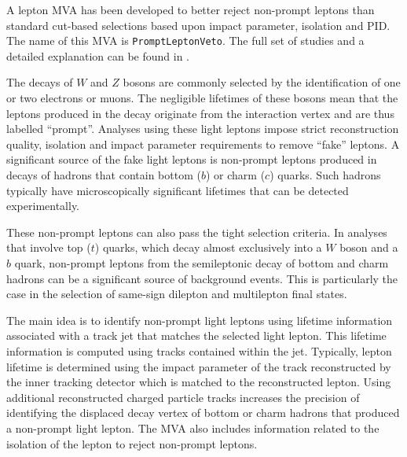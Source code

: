 
A lepton MVA has been developed to better reject non-prompt leptons than standard cut-based selections based upon impact parameter, isolation and PID. The name of this MVA is \texttt{PromptLeptonVeto}. The full set of studies and a detailed explanation can be found in \cite{ttW_140}.

The decays of $W$ and $Z$ bosons are commonly selected by the identification of one or two electrons or muons.  The negligible lifetimes of these bosons mean that the leptons produced in the decay originate from the interaction vertex and are thus labelled ``prompt''.  Analyses using these light leptons impose strict reconstruction quality, isolation and impact parameter requirements to remove ``fake'' leptons. A significant source of the fake light leptons is non-prompt leptons produced in decays of hadrons that contain bottom ($b$) or charm ($c$) quarks. Such hadrons typically have microscopically significant lifetimes that can be detected experimentally.

These non-prompt leptons can also pass the tight selection criteria. In analyses that involve top ($t$) quarks, which decay almost exclusively into a $W$ boson and a $b$ quark, non-prompt leptons from the semileptonic decay of bottom and charm hadrons can be a significant source of background events. This is particularly the case in the selection of same-sign dilepton and multilepton final states. 

The main idea is to identify non-prompt light leptons using lifetime information associated with a track jet that matches the selected light lepton. This lifetime information is computed using tracks contained within the jet. Typically, lepton lifetime is determined using the impact parameter of the track reconstructed by the inner tracking detector which is matched to the reconstructed lepton. Using additional reconstructed charged particle tracks increases the precision of identifying the displaced decay vertex of bottom or charm hadrons that produced a non-prompt light lepton. The MVA also includes information related to the isolation of the lepton to reject non-prompt leptons.

